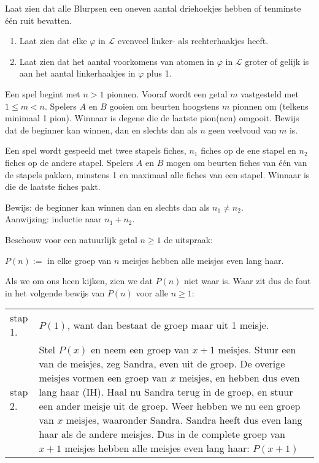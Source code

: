 \todo
\begin{answer} %
Laat zien dat alle Blurpsen een oneven aantal driehoekjes hebben of tenminste \'e\'en ruit bevatten.
\end{answer}

\begin{answer}\mbox{}  %
\begin{enumerate}[label=\arabic*.]
    \item Laat zien dat elke $\varphi$ in $\mathcal{L}$ evenveel linker- als rechterhaakjes heeft.
    \item Laat zien dat het aantal voorkomens van atomen in $\varphi$ in $\mathcal{L}$ groter of gelijk is aan het aantal linkerhaakjes in $\varphi$ plus 1.
\end{enumerate}
\end{answer}

\begin{answer}[Optioneel] %
Een spel begint met $n>1$ pionnen. Vooraf wordt een getal $m$ vastgesteld met $1\leq m<n$. Spelers $A$ en $B$ gooien om beurten hoogstens $m$ pionnen om (telkens minimaal 1 pion). Winnaar is degene die de laatste pion(nen) omgooit. Bewijs dat de beginner kan winnen, dan en slechts dan als $n$ geen veelvoud van $m$ is.
\end{answer}

\begin{answer}[Optioneel] %
Een spel wordt gespeeld met twee stapels fiches, $n_1$ fiches op de ene stapel en $n_2$ fiches op de andere stapel. Spelers $A$ en $B$ mogen om beurten fiches van \'e\'en van de stapels pakken, minstens 1 en maximaal alle fiches van een stapel. Winnaar is die de laatste fiches pakt.

Bewijs: de beginner kan winnen dan en slechts dan als $n_1\not =n_2$.\\
Aanwijzing: inductie naar $n_1+n_2$.
\end{answer}

\begin{answer}[Optioneel] %
Beschouw voor een natuurlijk getal $n\geq 1$ de uitspraak:

\noindent $P(n):=$ in elke groep van $n$ meisjes hebben alle meisjes even lang haar.

Als we om ons heen kijken, zien we dat $P(n)$ niet waar is. Waar zit dus de fout in het volgende bewijs van $P(n)$ voor alle $n\geq 1$:

\noindent\begin{tabular}{lp{}}
stap 1. & $P(1)$, want dan bestaat de groep maar uit 1 meisje.\\
stap 2. & Stel $P(x)$ en neem een groep van $x+1$ meisjes. Stuur een van de meisjes, zeg Sandra, even uit de groep. De overige meisjes vormen een groep van $x$ meisjes, en hebben dus even lang haar (IH). Haal nu Sandra terug in de groep, en stuur een ander meisje uit de groep. Weer hebben we nu een groep van $x$ meisjes, waaronder Sandra. Sandra heeft dus even lang haar als de andere meisjes. Dus in de complete groep van $x+1$ meisjes hebben alle meisjes even lang haar: $P(x+1)$
\end{tabular}
\end{answer}

